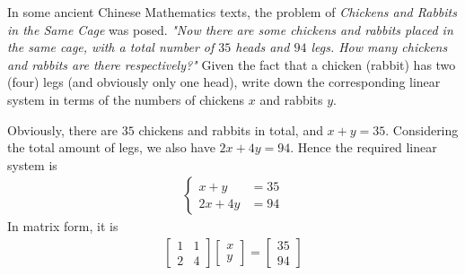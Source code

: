 \begin{Exercise}
\label{ex:animals}
In some ancient Chinese Mathematics texts, the problem of \textit{Chickens and Rabbits in the Same Cage} was posed. \textit{"Now there are some chickens and rabbits placed in the same cage, with a total number of $35$ heads and $94$ legs. How many chickens and rabbits are there respectively?"} Given the fact that a chicken (rabbit) has two (four) legs (and obviously only one head), write down the corresponding linear system in terms of the numbers of chickens $x$ and rabbits $y$.
\end{Exercise}
\begin{Answer}
Obviously, there are $35$ chickens and rabbits in total, and $x + y = 35$. Considering the total amount of legs, we also have $2x + 4y = 94$. Hence the required linear system is
\begin{align*}
\begin{cases}
x + y &= 35\\
2x + 4y &= 94
\end{cases}    
\end{align*}
In matrix form, it is
\begin{align*}
\begin{bmatrix}
1 & 1 \\
2 & 4 
\end{bmatrix}
\begin{bmatrix}
x \\
y
\end{bmatrix}
=
\begin{bmatrix}
35 \\
94
\end{bmatrix}
\end{align*}
\end{Answer}